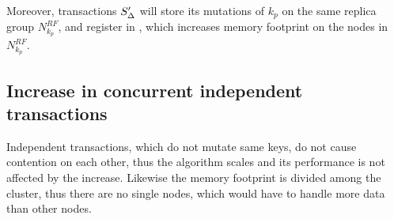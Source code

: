 Moreover, transactions $S'_{\text{$\Delta$}}$ will store its mutations of $k_p$ on the same replica group $N^{RF}_{k_p}$, and register in \txIndex, which increases memory footprint on the nodes in $N^{RF}_{k_p}$.

\subsection{Increase in concurrent independent transactions}
Independent transactions, which do not mutate same keys, do not cause contention on each other, thus the algorithm scales and its performance is not affected by the increase. Likewise the memory footprint is divided among the cluster, thus there are no single nodes, which would have to handle more data than other nodes.







